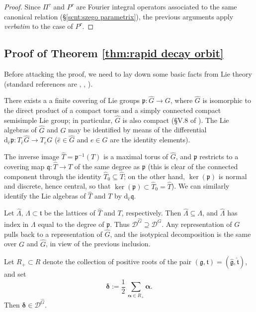 \documentclass[12pt,a4paper]{article}
\theoremstyle{plain}
\theoremstyle{definition}
\begin{document}
\begin{proof}
Since $\Pi^\tau$ and $P^\tau$ are Fourier integral
operators associated to the same canonical relation
(\S \ref{scnt:szego parametrix}), 
the previous arguments apply \textit{verbatim}
to the case of $P^\tau$.

\end{proof}

\subsection{Proof of Theorem \ref{thm:rapid decay orbit}}

Before attacking the proof, we need to lay down some 
basic facts from Lie theory
(standard references are 
\cite{btd}, \cite{var har}, \cite{var lie}).

There exists a a finite covering of Lie groups 
$\mathfrak{p}:
\hat{G}\rightarrow G$, where $\hat{G}$ is isomorphic
to the direct product of a compact torus and 
a simply connected compact semisimple Lie group;
in particular, $\hat{G}$ is also compact (\S V.8 of
\cite{btd}). 
The Lie algebras
of $\hat{G}$ and $G$ 
may be identified by means of
the differential 
$\mathrm{d}_{\hat{e}}\mathfrak{p}:
T_{\hat{e}}\hat{G}\rightarrow T_eG$ ($\hat{e}\in \hat{G}$ and
$e\in G$ are the identity elements).

The inverse image $\hat{T}=\mathfrak{p}^{-1}(T)$
is a maximal torus of $\hat{G}$, and $\mathfrak{p}$
restricts to a covering map $\mathfrak{q}:
\hat{T}\rightarrow T$ of the same degree as
$\mathfrak{p}$ (this is clear of the connected component
through the identity $\hat{T}_0\subseteq \hat{T}$;
on the other hand, $\ker(\mathfrak{p})$ is normal and
discrete, hence central, so that $\ker(\mathfrak{p})
\subset \hat{T}_0=\hat{T}$).
We can similarly identify the Lie algebras 
of $\hat{T}$ and $T$ by 
$\mathrm{d}_{\hat{e}}\mathfrak{q}$.

Let $\hat{\Lambda},\,\Lambda\subset \mathfrak{t}$ be the
lattices of $\hat{T}$ and $T$, respectively.
Then $\hat{\Lambda}\subseteq \Lambda$, and 
$\hat{\Lambda}$ has index in $\Lambda$ equal to the degree
of $\mathfrak{p}$. Thus
$\mathcal{D}^{\hat{G}}\supseteq \mathcal{D}^G$.
%
Any representation of $G$ pulls back to 
a representation of $\hat{G}$, and the isotypical
decomposition is the same over $G$ and $\hat{G}$,
in view of the previous inclusion.

Let $R_+\subset R$ denote the collection of positive roots
of the pair $(\mathfrak{g},\mathfrak{t})
=(\hat{\mathfrak{g}},\hat{\mathfrak{t}})$,
and set
\begin{equation}
\label{eqn:half sum prs}
\boldsymbol{\delta}:=\frac{1}{2}\,
\sum_{\boldsymbol{\alpha}\in R_+}
\boldsymbol{\alpha}.
\end{equation}
Then $\boldsymbol{\delta}\in \mathcal{D}^{\hat{G}}$.
\end{document}
